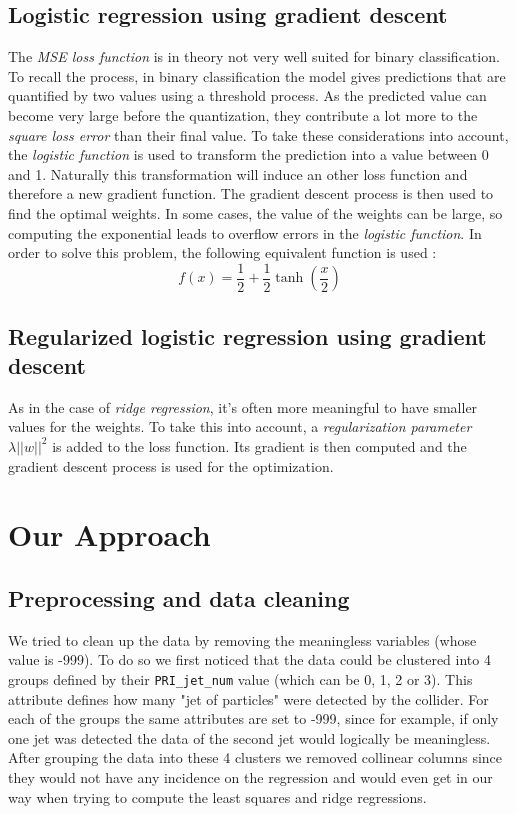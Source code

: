 \documentclass[10pt,conference,compsocconf]{IEEEtran}
\begin{document}
\subsection{Logistic regression using gradient descent}
The \textit{MSE loss function} is in theory not very well suited for binary classification. To recall the process, in binary classification the model gives predictions that are quantified by two values using a threshold process. As the predicted value can become very large before the quantization, they contribute a lot more to the \textit{square loss error} than their final value. To take these considerations into account, the \textit{logistic function} is used to transform the prediction into a value between 0 and 1. Naturally this transformation will induce an other loss function and therefore a new gradient function. The gradient descent process is then used to find the optimal weights. In some cases, the value of the weights can be large, so computing the exponential leads to overflow errors in the \textit{logistic function}. In order to solve this problem, the following equivalent function is used : 
\begin{equation}
f(x) = \frac{1}{2}+\frac{1}{2}\tanh \left(\frac{x}{2}\right)
\end{equation} 

\subsection{Regularized logistic regression using gradient descent}

As in the case of \textit{ridge regression}, it's often more meaningful to have smaller values for the weights. To take this into account, a \textit{regularization parameter} $\lambda \vert\vert w \vert\vert ^2$ is added to the loss function. Its gradient is then computed and the gradient descent process is used for the optimization.


\section{Our Approach}

\subsection{Preprocessing and data cleaning}
We tried to clean up the data by removing the meaningless variables (whose value is -999). To do so we first noticed that the data could be clustered into 4 groups defined by their \texttt{PRI\_jet\_num} value (which can be 0, 1, 2 or 3). This attribute defines how many "jet of particles" were detected by the collider. For each of the groups the same attributes are set to -999, since for example, if only one jet was detected the data of the second jet would logically be meaningless. After grouping the data into these 4 clusters we removed collinear columns since they would not have any incidence on the regression and would even get in our way when trying to compute the least squares and ridge regressions.
\end{document}
